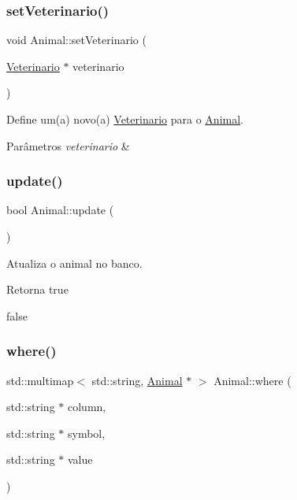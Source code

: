 \subsubsection{\texorpdfstring{set\+Veterinario()}{setVeterinario()}}
{\footnotesize\ttfamily void Animal\+::set\+Veterinario (\begin{DoxyParamCaption}\item[{\hyperlink{classVeterinario}{Veterinario} $\ast$}]{veterinario }\end{DoxyParamCaption})}



Define um(a) novo(a) \hyperlink{classVeterinario}{Veterinario} para o \hyperlink{classAnimal}{Animal}. 


\begin{DoxyParams}{Parâmetros}
{\em veterinario} & \\
\hline
\end{DoxyParams}
\mbox{\label{classAnimal_a2b9de87e4f753fc9f92aeb012bf098c5}} 
\subsubsection{\texorpdfstring{update()}{update()}}
{\footnotesize\ttfamily bool Animal\+::update (\begin{DoxyParamCaption}{ }\end{DoxyParamCaption})}



Atualiza o animal no banco. 

\begin{DoxyReturn}{Retorna}
true 

false 
\end{DoxyReturn}
\mbox{\label{classAnimal_a42e0c72ec2c9881cbf5d1be57c418cc5}} 
\subsubsection{\texorpdfstring{where()}{where()}\hspace{0.1cm}{\footnotesize\ttfamily [1/2]}}
{\footnotesize\ttfamily std\+::multimap$<$ std\+::string, \hyperlink{classAnimal}{Animal} $\ast$ $>$ Animal\+::where (\begin{DoxyParamCaption}\item[{std\+::string $\ast$}]{column,  }\item[{std\+::string $\ast$}]{symbol,  }\item[{std\+::string $\ast$}]{value }\end{DoxyParamCaption})\hspace{0.3cm}{\ttfamily [static]}}



